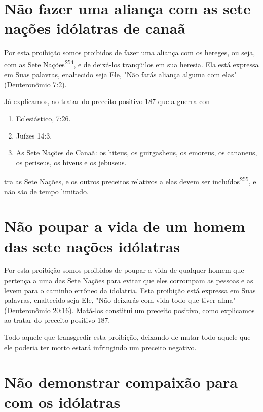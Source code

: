\begin{itemize}
\begin{enumrate}
\begin{itemize}
\begin{itemize}
\begin{itemize}
\section{Não fazer uma aliança com as sete nações idólatras de canaã}

Por esta proibição somos proibidos de fazer uma aliança com os he­reges,
ou seja, com as Sete Nações\textsuperscript{254}, e de deixá-los
tranqüilos em sua here­sia. Ela está expressa em Suas palavras,
enaltecido seja Ele, "Não farás aliança alguma com elas" (Deuteronômio
7:2).


Já explicamos, ao tratar do preceito positivo 187 que a guerra con-

\begin{enumerate}
\def\labelenumi{\arabic{enumi}.}
\setcounter{enumi}{251}
\item
 
 Eclesiástico, 7:26.
 
\item
 
 Juízes 14:3.
 
\item
 
 As Sete Nações de Canaã: os hiteus, os guirgasheus, os emoreus, os
 cananeus, os periseus, os hiveus e os jebuseus.
 
\end{enumerate}



tra as Sete Nações, e os outros preceitos relativos a elas devem ser
incluídos\textsuperscript{255}, e não são de tempo limitado.

\section{Não poupar a vida de um homem das sete nações idólatras}

Por esta proibição somos proibidos de poupar a vida de qualquer homem
que pertença a uma das Sete Nações para evitar que eles corrompam as
pessoas e as levem para o caminho errôneo da idolatria. Esta proibição
está expressa em Suas palavras, enaltecido seja Ele, "Não deixarás com
vida todo que tiver alma" (Deuteronômio 20:16). Matá-los constitui um
preceito positi­vo, como explicamos ao tratar do preceito positivo 187.

Todo aquele que transgredir esta proibição, deixando de matar to­do
aquele que ele poderia ter morto estará infringindo um preceito
negativo.

\section{Não demonstrar compaixão para com os idólatras}


\end{itemize}
\end{itemize}
\end{itemize}
\end{enumrate}
\end{itemize}
